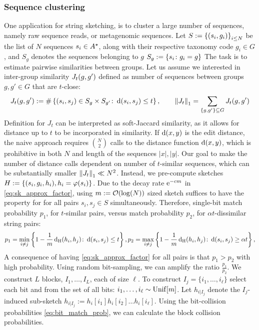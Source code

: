 \subsubsection*{Sequence clustering}
One application for string sketching, is to cluster a large number of sequences, namely raw sequence reads, or metagenomic sequences. 
Let $S:=\left\{(s_i,g_i)\right\}_{i\le N}$ be the list of $N$ sequences $s_i\in A^\star$, along with their respective taxonomy code $g_i\in G$, and $S_g$ denotes the sequences belonging to $g$ $S_g:=\left\{s_i\colon g_i=g\right\}$ The task is to estimate pairwise similarities between groups. Let us assume we interested in inter-group similarity $J_t(g,g')$ defined as number of sequences between groups $g,g'\in G$ that are $t$-close:
\[
J_t(g,g'):= \#\left\{(s_i,s_j)\in S_g\times S_{g'}\colon \operatorname{\mathrm{d}}(s_i,s_j)\le t\right\},  \qquad \left\lVert J_t\right\rVert_1=\sum_{\left\{g,g'\right\}\subseteq G} J_t(g,g')
\]
Definition for $J_t$ can be interpreted as soft-Jaccard similarity, as it allows for distance up to $t$ to be incorporated in similarity. If $\operatorname{\mathrm{d}}(x,y)$ is the edit distance, the naive approach requires $\binom{N}{2}$ calls to the distance function $\operatorname{\mathrm{d}}(x,y)$, which is prohibitive in both $N$ and length of the sequences $|x|,|y|$. Our goal to make the number of distance calls dependent on number of $t$-similar sequences, which can be substantially smaller $\left\lVert J_t\right\rVert_1\ll N^2$. Instead, we pre-compute sketches $H:=\left\{(s_i,g_i,h_i), h_i=\operatorname{\varphi}(s_i)\right\}$. Due to the decay rate $\text{e}^{-c m}$ in \eqref{eq:sk_approx_factor}, using $m:=\mathcal{O}(\log(N))$ sized sketch suffices to have the property for for all pairs $s_i,s_j\in S$ simultaneously. Therefore, single-bit match probability $p_1$, for $t$-similar pairs, versus match probability $p_2$, for $\alpha t$-dissimilar string pairs:
\begin{equation}
\label{eq:bit_match_prob}
p_1=\min_{i\neq j}\left\{1-\frac{1}{m}\operatorname{\mathrm{d_{H}}}(h_i,h_j)\colon  \operatorname{\mathrm{d}}(s_i,s_j)\le t\right\},
p_2=\max_{i\neq j}\left\{1-\frac{1}{m}\operatorname{\mathrm{d_{H}}}(h_i,h_j) \colon \operatorname{\mathrm{d}}(s_i,s_j)\ge \alpha t\right\},
\end{equation}
A consequence of having \eqref{eq:sk_approx_factor} for all pairs is that $p_1>p_2$ with high probability. 
Using random bit-sampling, we can amplify the ratio $\frac{p_1}{p_2}$. We construct $L$ blocks, $I_1,\dots,I_L$, each of size $\ell$. To construct $I_j=\{i_1,\dots, i_\ell\}$ select each bit \iid and \uar from the set of all bits: $i_1,\dots,i_\ell\sim\operatorname{\mathrm{Unif}}[m]$. Let $h_{i|I_j}$ denote the $I_j$-induced sub-sketch $h_{i|I_j}:=h_i[i_1] h_i[i_2] \dots h_i[i_\ell]$. Using the bit-collision probabilities \eqref{eq:bit_match_prob}, we can calculate the block collision probabilities.  
